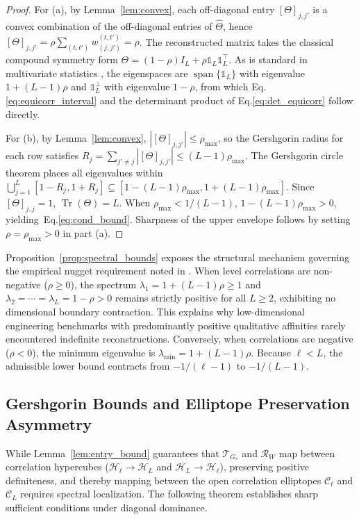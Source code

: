 \documentclass[default,sn-mathphys,Numbered]{sn-jnl}
\theoremstyle{thmstyleone}
\theoremstyle{thmstylethree}
\theoremstyle{thmstyletwo}
\newcommand{\Tr}{\operatorname{Tr}}
\newcommand{\eqnref}[1]{\eqref{#1}}
\begin{document}
\begin{proof}
For (a), by Lemma~\ref{lem:convex}, each off-diagonal entry $[\Theta]_{j, j'}$ is a convex combination of the off-diagonal entries of $\hat{\Theta}$, hence $[\Theta]_{j, j'} = \rho \sum_{(t,t')} w_{(j,j')}^{(t,t')} = \rho$. The reconstructed matrix takes the classical compound symmetry form $\Theta = (1 - \rho) I_L + \rho \mathds{1}_L \mathds{1}_L^\top$. As is standard in multivariate statistics \citep{morrison1967multivariate}, the eigenspaces are $\operatorname{span}\{\mathds{1}_L\}$ with eigenvalue $1 + (L-1)\rho$ and $\mathds{1}_L^\perp$ with eigenvalue $1 - \rho$, from which Eq.\eqnref{eq:equicorr_interval} and the determinant product of Eq.\eqnref{eq:det_equicorr} follow directly.

For (b), by Lemma~\ref{lem:convex}, $|[\Theta]_{j, j'}| \le \rho_{\max}$, so the Gershgorin radius for each row satisfies $R_j = \sum_{j' \neq j} |[\Theta]_{j, j'}| \le (L-1)\rho_{\max}$. The Gershgorin circle theorem places all eigenvalues within $\bigcup_{j=1}^L [1 - R_j, 1 + R_j] \subseteq [1 - (L-1)\rho_{\max}, 1 + (L-1)\rho_{\max}]$. Since $[\Theta]_{j, j} = 1$, $\Tr(\Theta) = L$. When $\rho_{\max} < 1/(L-1)$, $1 - (L-1)\rho_{\max} > 0$, yielding~Eq.\eqnref{eq:cond_bound}. Sharpness of the upper envelope follows by setting $\rho = \rho_{\max} > 0$ in part (a).
\end{proof}


Proposition~\ref{prop:spectral_bounds} exposes the structural mechanism governing the empirical nugget requirement noted in \citet{saves2023high}. When level correlations are non-negative ($\rho \ge 0$), the spectrum $\lambda_1 = 1 + (L-1)\rho \ge 1$ and $\lambda_2 = \cdots = \lambda_L = 1 - \rho > 0$ remains strictly positive for all $L \ge 2$, exhibiting no dimensional boundary contraction. This explains why low-dimensional engineering benchmarks with predominantly positive qualitative affinities \citep{saves2023high} rarely encountered indefinite reconstructions. Conversely, when correlations are negative ($\rho < 0$), the minimum eigenvalue is $\lambda_{\min} = 1 + (L-1)\rho$. Because $\ell < L$, the admissible lower bound contracts from $-1/(\ell-1)$ to $-1/(L-1)$. 

\subsection{Gershgorin Bounds and Elliptope Preservation Asymmetry}
\label{subsec:hypercube_gershgorin}

While Lemma~\ref{lem:entry_bound} guarantees that $\mathcal{T}_{G_*}$ and $\mathcal{R}_W$ map between correlation hypercubes ($\mathcal{H}_\ell \to \mathcal{H}_L$ and $\mathcal{H}_L \to \mathcal{H}_\ell$), preserving positive definiteness, and thereby mapping between the open correlation elliptopes $\mathcal{C}_\ell$ and $\mathcal{C}_L$ requires spectral localization. The following theorem establishes sharp sufficient conditions under diagonal dominance.
\end{document}
